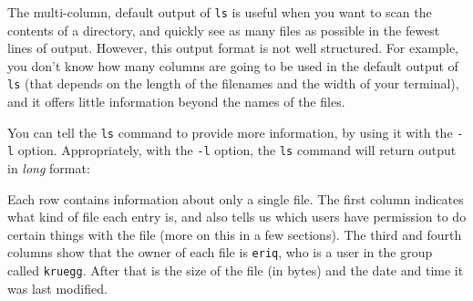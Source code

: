 \documentclass[]{krantz}
\makeatletter
\newenvironment{Shaded}{\begin{snugshade}}{\end{snugshade}}
\newcommand{\ExtensionTok}[1]{#1}
\newcommand{\NormalTok}[1]{#1}
\newenvironment{kframe}{%
\medskip{}
\setlength{\fboxsep}{.8em}
 \def\at@end@of@kframe{}%
 \ifinner\ifhmode%
  \def\at@end@of@kframe{\end{minipage}}%
  \begin{minipage}{\columnwidth}%
 \fi\fi%
 \def\FrameCommand##1{\hskip\@totalleftmargin \hskip-\fboxsep
 \colorbox{shadecolor}{##1}\hskip-\fboxsep
     \hskip-\linewidth \hskip-\@totalleftmargin \hskip\columnwidth}%
 \MakeFramed {\advance\hsize-\width
   \@totalleftmargin\z@ \linewidth\hsize
   \@setminipage}}%
 {\par\unskip\endMakeFramed%
 \at@end@of@kframe}
\renewenvironment{Shaded}{\begin{kframe}}{\end{kframe}}
\makeatother
\begin{document}
The multi-column, default output of \texttt{ls} is useful when you want
to scan the contents of a directory, and quickly see as many files
as possible in the fewest lines of output.
However, this output format is not well
structured. For example, you don't know how many columns are going to be used in
the default output of \texttt{ls} (that
depends on the length of the filenames and the width of your terminal), and it
offers little information beyond the names of the files.

You can tell the \texttt{ls} command to provide more information, by using it with the \texttt{-l}
option. Appropriately, with the \texttt{-l} option, the \texttt{ls} command will return
output in \emph{long} format:

\begin{Shaded}
\end{Shaded}

Each row contains information about only a single file.
The first column indicates what kind of file
each entry is, and also tells us which users have permission to
do certain things with the file (more on this in a few sections).
The third and fourth columns show that the owner of
each file is \texttt{eriq}, who is a user in the group called \texttt{kruegg}. After that
is the size of the file (in bytes) and the date and time it was last modified.
\end{document}

